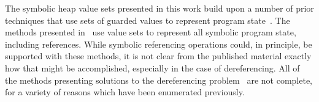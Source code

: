 The symbolic heap value sets presented in this work build upon a number of prior techniques that use sets of guarded values to represent program state~\cite{Sen:2014,Torlak:2014,Yorsh:2008,Xie:2005,Dillig:2011,Elkarablieh:2009}. The methods presented in~\cite{Sen:2014,Torlak:2014,Yorsh:2008} use value sets to represent all symbolic program state, including references. While symbolic referencing operations could, in principle, be supported with these methods, it is not clear from the published material exactly how that might be accomplished, especially in the case of dereferencing. All of the methods presenting solutions to the dereferencing problem~\cite{Xie:2005,Dillig:2011,Elkarablieh:2009} are not complete, for a variety of reasons which have been enumerated previously.

